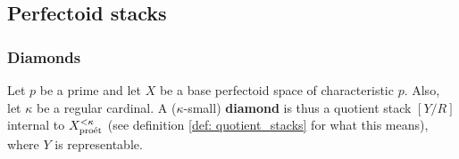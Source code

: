         \subsection{Perfectoid stacks}        
            \subsubsection{Diamonds}
                \begin{definition}[Diamonds] \label{def: diamonds} 
                    Let $p$ be a prime and let $X$ be a base perfectoid space of characteristic $p$. Also, let $\kappa$ be a regular cardinal. A ($\kappa$-small) \textbf{diamond} is thus a quotient stack $[Y/R]$ internal to $X_{\mathrm{pro\acute{e}t}}^{< \kappa}$ (see definition \ref{def: quotient_stacks} for what this means), where $Y$ is representable.
                \end{definition}
                
